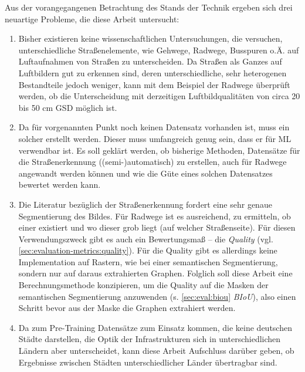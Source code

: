 Aus der vorangegangenen Betrachtung des Stands der Technik ergeben sich drei neuartige Probleme, die 
diese Arbeit untersucht:
\begin{enumerate}
	\item Bisher existieren keine wissenschaftlichen Untersuchungen, die versuchen, unterschiedliche Straßenelemente,
	wie Gehwege, Radwege, Busspuren o.Ä. auf Luftaufnahmen von Straßen zu unterscheiden. Da Straßen als Ganzes 
	auf Luftbildern gut zu erkennen sind, deren unterschiedliche, sehr heterogenen Bestandteile jedoch weniger, 
	kann mit dem Beispiel der Radwege überprüft werden, ob die Unterscheidung mit derzeitigen Luftbildqualitäten von circa 20 bis 50 cm \ac{GSD} 
	möglich ist. 
	\item Da für vorgenannten Punkt noch keinen Datensatz vorhanden ist, muss ein solcher erstellt werden. Dieser muss umfangreich 
	genug sein, dass er für \ac{ML} verwendbar ist. Es soll geklärt werden, ob bisherige Methoden, Datensätze für die Straßenerkennung 
	((semi-)automatisch) zu erstellen, auch für Radwege angewandt werden können und wie die Güte eines solchen Datensatzes bewertet werden kann. 
	\item Die Literatur bezüglich der Straßenerkennung fordert eine sehr genaue Segmentierung des Bildes. Für Radwege ist es ausreichend, 
	zu ermitteln, ob einer existiert und wo dieser grob liegt (auf welcher Straßenseite). Für diesen Verwendungszweck gibt 
	es auch ein Bewertungsmaß -- die \textit{Quality} (vgl. \autoref{sec:evaluation-metrics:quality}). Für die Quality gibt es allerdings
	keine Implementation auf Rastern, wie bei einer semantischen Segmentierung, sondern nur auf daraus extrahierten Graphen. 
	Folglich soll diese Arbeit eine Berechnungsmethode konzipieren, um die Quality auf die Masken der semantischen Segmentierung anzuwenden 
	(s. \autoref{sec:eval:biou} \textit{BIoU}), also einen Schritt bevor aus der Maske die Graphen extrahiert werden.  
	\item Da zum Pre-Training Datensätze zum Einsatz kommen, die keine deutschen Städte darstellen, 
	die Optik der Infrastrukturen sich in unterschiedlichen Ländern aber unterscheidet, kann diese Arbeit 
	Aufschluss darüber geben, ob Ergebnisse zwischen Städten unterschiedlicher Länder übertragbar sind.     
\end{enumerate} 